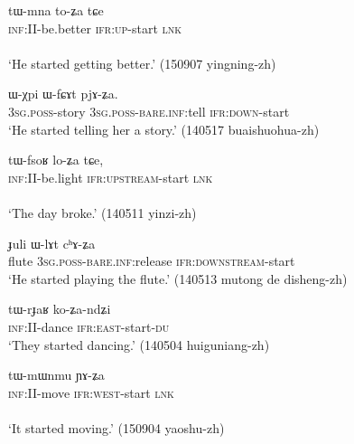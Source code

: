 \begin{exe} 
\ex \label{ex:tWmna.toZa}
\gll tɯ-mna to-ʑa tɕe \\
\textsc{inf}:II-be.better \textsc{ifr}:\textsc{up}-start \textsc{lnk} \\
\\
\glt `He started getting better.' (150907 yingning-zh)
\end{exe} 

\begin{exe} 
\ex \label{ex:WfCAt.pjAZa}
\gll ɯ-χpi ɯ-fɕɤt pjɤ-ʑa. \\
\textsc{3sg}.\textsc{poss}-story \textsc{3sg}.\textsc{poss}-\textsc{bare}.\textsc{inf}:tell \textsc{ifr}:\textsc{down}-start \\
\glt `He started telling her a story.' (140517 buaishuohua-zh)
\end{exe} 

\begin{exe} 
\ex \label{ex:tWfsoR.loZa}
\gll tɯ-fsoʁ lo-ʑa tɕe, \\
\textsc{inf}:II-be.light \textsc{ifr}:\textsc{upstream}-start \textsc{lnk} \\
\\
\glt `The day broke.' (140511 yinzi-zh)
\end{exe} 

\begin{exe} 
\ex \label{ex:WlAt.chAZa}
\gll  ɟuli ɯ-lɤt cʰɤ-ʑa  \\
flute  \textsc{3sg}.\textsc{poss}-\textsc{bare}.\textsc{inf}:release \textsc{ifr}:\textsc{downstream}-start \\
\glt `He started playing the flute.' (140513 mutong de disheng-zh)
\end{exe} 

\begin{exe} 
\ex \label{ex:tWrJaR.koZandZi}
\gll tɯ-rɟaʁ ko-ʑa-ndʑi \\
\textsc{inf}:II-dance \textsc{ifr}:\textsc{east}-start-\textsc{du} \\
\glt `They started dancing.' (140504 huiguniang-zh)
\end{exe} 

\begin{exe} 
\ex \label{ex:tWmWnmu.YAZa}
\gll tɯ-mɯnmu ɲɤ-ʑa \\
\textsc{inf}:II-move \textsc{ifr}:\textsc{west}-start \textsc{lnk} \\
\\
\glt `It started moving.' (150904 yaoshu-zh)
\end{exe} 

